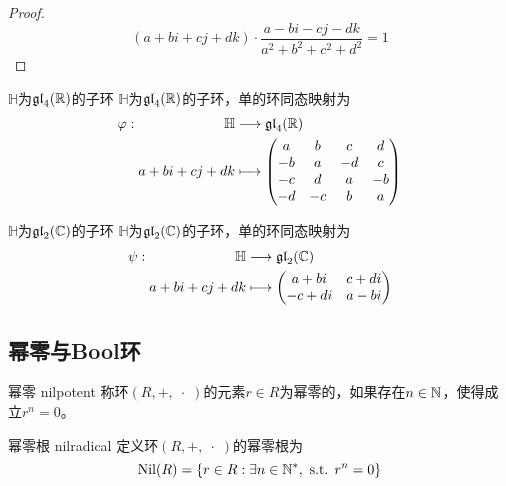 \begin{proof}
	$$
	(a+bi+cj+dk)\cdot\frac{a-bi-cj-dk}{a^2+b^2+c^2+d^2}=1
	$$
\end{proof}

\begin{proposition}{$\mathbb{H}$为$\mathfrak{gl}_4(\mathbb{R})$的子环}
	$\mathbb{H}$为$\mathfrak{gl}_4(\mathbb{R})$的子环，单的环同态映射为
	\begin{align*}
		\varphi:\begin{aligned}[t]
			\mathbb{H}&\longrightarrow\mathfrak{gl}_4(\mathbb{R})\\
			a+bi+cj+dk&\longmapsto 
			\begin{pmatrix}
				a&b&c&d\\
				-b&a&-d&c\\
				-c&d&a&-b\\
				-d&-c&b&a
			\end{pmatrix}
		\end{aligned}
	\end{align*}
\end{proposition}

\begin{proposition}{$\mathbb{H}$为$\mathfrak{gl}_2(\mathbb{C})$的子环}
	$\mathbb{H}$为$\mathfrak{gl}_2(\mathbb{C})$的子环，单的环同态映射为
	\begin{align*}
		\psi:\begin{aligned}[t]
			\mathbb{H}&\longrightarrow\mathfrak{gl}_2(\mathbb{C})\\
			a+bi+cj+dk&\longmapsto \begin{pmatrix}
				a+bi&c+di\\
				-c+di&a-bi
			\end{pmatrix}
		\end{aligned}
	\end{align*}
\end{proposition}


\subsection{幂零与Bool环}

\begin{definition}{幂零 nilpotent}
	称环$(R,+,\;\cdot\;)$的元素$r\in R$为幂零的，如果存在$n\in\mathbb{N}$，使得成立$r^n=0$。
\end{definition}

\begin{definition}{幂零根 nilradical}
	定义环$(R,+,\;\cdot\;)$的幂零根为
	$$
	\mathrm{Nil}(R)=\{ r\in R:\exists n\in\mathbb{N}^*,\text{ s.t. }r^n=0 \}
	$$
\end{definition}

